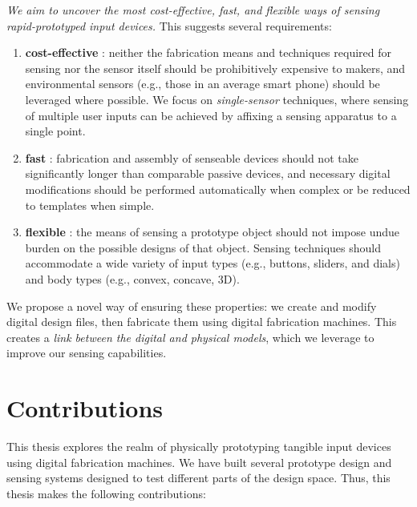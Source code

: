 \emph{We aim to uncover the most cost-effective, fast, and flexible ways of sensing rapid-prototyped input devices.} This suggests several requirements:
\begin{enumerate}
\item \textbf{cost-effective} : neither the fabrication means and techniques required for sensing nor the sensor itself should be prohibitively expensive to makers, and environmental sensors (e.g., those in an average smart phone) should be leveraged where possible. We focus on \emph{single-sensor} techniques, where sensing of multiple user inputs can be achieved by affixing a sensing apparatus to a single point. 
\item \textbf{fast} : fabrication and assembly of senseable devices should not take significantly longer than comparable passive devices, and necessary digital modifications should be performed automatically when complex or be reduced to templates when simple.
\item \textbf{flexible} : the means of sensing a prototype object should not impose undue burden on the possible designs of that object. Sensing techniques should accommodate a wide variety of input types (e.g., buttons, sliders, and dials) and body types (e.g., convex, concave, 3D).
\end{enumerate}
We propose a novel way of ensuring these properties: we create and modify digital design files, then fabricate them using digital fabrication machines. This creates a \emph{link between the digital and physical models}, which we leverage to improve our sensing capabilities.

\section{Contributions}

This thesis explores the realm of physically prototyping tangible input devices using digital fabrication machines. We have built several prototype design and sensing systems designed to test different parts of the design space. Thus, this thesis makes the following contributions:

